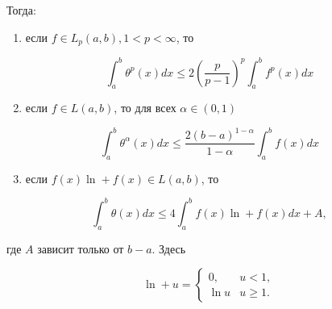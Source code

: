 \documentclass[10pt]{article}
\begin{document}
Тогда:



\begin{enumerate}

  \item если $f \in L_{p}(a, b), 1<p<\infty$, то

\end{enumerate}



\[

\int_{a}^{b} \theta^{p}(x) d x \leqslant 2\left(\frac{p}{p-1}\right)^{p} \int_{a}^{b} f^{p}(x) d x

\]



\begin{enumerate}

  \setcounter{enumi}{1}

  \item если $f \in L(a, b)$, то для всех $\alpha \in(0,1)$

\end{enumerate}



\[

\int_{a}^{b} \theta^{\alpha}(x) d x \leqslant \frac{2(b-a)^{1-\alpha}}{1-\alpha} \int_{a}^{b} f(x) d x

\]



\begin{enumerate}

  \setcounter{enumi}{2}

  \item если $f(x) \ln +f(x) \in L(a, b)$, то

\end{enumerate}



\[

\int_{a}^{b} \theta(x) d x \leqslant 4 \int_{a}^{b} f(x) \ln +f(x) d x+A,

\]



где $A$ зависит только от $b-a$. Здесь



\[

\ln +u= \begin{cases}0, & u<1, \\ \ln u & u \geqslant 1 .\end{cases}

\]
\end{document}
